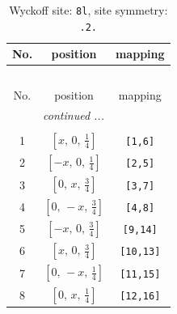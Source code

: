 \documentclass[fleqn,8pt]{jsarticle}
\begin{document}
\begin{longtable}{ccc}
\caption{Wyckoff site: {\tt 8l}, site symmetry: {\tt .2.}}
 \\
 \hline \hline
No. & position & mapping \\ \hline \endfirsthead

\multicolumn{2}{l}{\tablename\ \thetable{}} \\
 \hline \hline
No. & position & mapping \\ \hline \endhead

 \hline \hline
\multicolumn{2}{r}{\footnotesize\it continued ...} \\ \endfoot

 \hline \hline
\multicolumn{2}{r}{} \\ \endlastfoot

1 & $\left[ x,\, 0,\, \frac{1}{4} \right]$ & {\tt [1,6]} \\ \hline
2 & $\left[ - x,\, 0,\, \frac{1}{4} \right]$ & {\tt [2,5]} \\ \hline
3 & $\left[ 0,\, x,\, \frac{3}{4} \right]$ & {\tt [3,7]} \\ \hline
4 & $\left[ 0,\, - x,\, \frac{3}{4} \right]$ & {\tt [4,8]} \\ \hline
5 & $\left[ - x,\, 0,\, \frac{3}{4} \right]$ & {\tt [9,14]} \\ \hline
6 & $\left[ x,\, 0,\, \frac{3}{4} \right]$ & {\tt [10,13]} \\ \hline
7 & $\left[ 0,\, - x,\, \frac{1}{4} \right]$ & {\tt [11,15]} \\ \hline
8 & $\left[ 0,\, x,\, \frac{1}{4} \right]$ & {\tt [12,16]} \\
\end{longtable}
\renewcommand{\arraystretch}{1.2}
\end{document}

